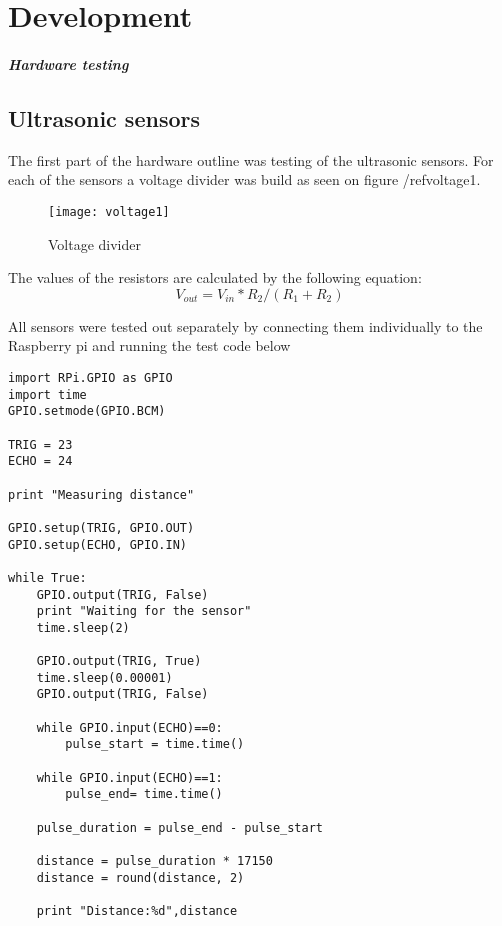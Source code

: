 \chapter{Development}\label{ch:development}

\paragraph{Hardware testing} 

\section{Ultrasonic sensors} \label{us_test}

The first part of the hardware outline was testing of the ultrasonic sensors.
For each of the sensors a voltage divider was build as seen on figure /ref{voltage1}.

\begin{figure}[h]
\centering
\texttt{[image: voltage1]}
\caption{Voltage divider}
\label{fig::voltage1}
\end{figure}

The values of the resistors are calculated by the following equation:
\begin{equation} \label{voltagedivider} 
{V}_{out}={V}_{in}*{R}_{2}/({R}_{1}+{R}_{2})
\end{equation}

All sensors were tested out separately by connecting them individually to the Raspberry pi and running the test code below

\begin{lstlisting}
import RPi.GPIO as GPIO
import time
GPIO.setmode(GPIO.BCM)

TRIG = 23
ECHO = 24

print "Measuring distance"

GPIO.setup(TRIG, GPIO.OUT)
GPIO.setup(ECHO, GPIO.IN)

while True:
	GPIO.output(TRIG, False)
	print "Waiting for the sensor"
	time.sleep(2)

	GPIO.output(TRIG, True)
	time.sleep(0.00001)
	GPIO.output(TRIG, False)

	while GPIO.input(ECHO)==0:
		pulse_start = time.time()

	while GPIO.input(ECHO)==1:
		pulse_end= time.time()

	pulse_duration = pulse_end - pulse_start

	distance = pulse_duration * 17150
	distance = round(distance, 2)

	print "Distance:%d",distance

\end{lstlisting}

